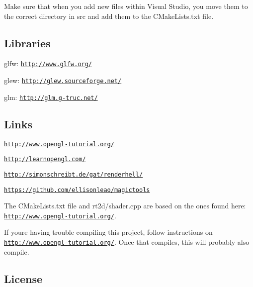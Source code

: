 Make sure that when you add new files within Visual Studio, you move them to the correct directory in {\ttfamily src} and add them to the {\ttfamily C\+Make\+Lists.\+txt} file.

\subsection*{Libraries }


\begin{DoxyItemize}
\item glfw\+: \href{http://www.glfw.org/}{\tt http\+://www.\+glfw.\+org/}
\item glew\+: \href{http://glew.sourceforge.net/}{\tt http\+://glew.\+sourceforge.\+net/}
\item glm\+: \href{http://glm.g-truc.net/}{\tt http\+://glm.\+g-\/truc.\+net/}
\end{DoxyItemize}

\subsection*{Links }


\begin{DoxyItemize}
\item \href{http://www.opengl-tutorial.org/}{\tt http\+://www.\+opengl-\/tutorial.\+org/}
\item \href{http://learnopengl.com/}{\tt http\+://learnopengl.\+com/}
\item \href{http://simonschreibt.de/gat/renderhell/}{\tt http\+://simonschreibt.\+de/gat/renderhell/}
\item \href{https://github.com/ellisonleao/magictools}{\tt https\+://github.\+com/ellisonleao/magictools}
\end{DoxyItemize}

The {\ttfamily C\+Make\+Lists.\+txt} file and {\ttfamily rt2d/shader.\+cpp} are based on the ones found here\+: \href{http://www.opengl-tutorial.org/}{\tt http\+://www.\+opengl-\/tutorial.\+org/}.

If you\textquotesingle{}re having trouble compiling this project, follow instructions on \href{http://www.opengl-tutorial.org/}{\tt http\+://www.\+opengl-\/tutorial.\+org/}. Once that compiles, this will probably also compile.

\subsection*{License }

